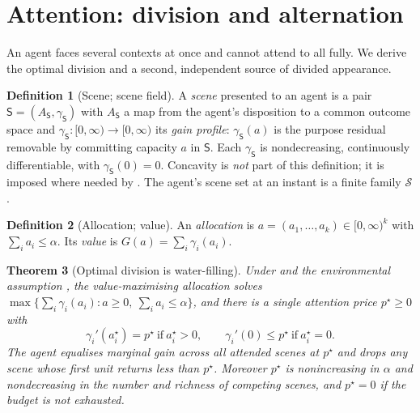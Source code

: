 \documentclass[11pt,a4paper]{article}
\theoremstyle{clstyle}
\newtheorem{theorem}{Theorem}[section]
\theoremstyle{definition}
\newtheorem{definition}[theorem]{Definition}
\theoremstyle{remark}
\newcommand{\price}{p^{\star}}
\newcommand{\att}{\alpha}
\newcommand{\Scene}{\mathsf{S}}
\newcommand{\scenes}{\mathcal{S}}
\begin{document}
\section{Attention: division and alternation}
\label{sec:attention}

An agent faces several contexts at once and cannot attend to all fully. We
derive the optimal division and a second, independent source of divided
appearance.

\begin{definition}[Scene; scene field]
\label{def:scene}
A \emph{scene} presented to an agent is a pair
$\Scene=(A_\Scene,\gamma_\Scene)$ with $A_\Scene$ a map from the agent's
disposition to a common outcome space and
$\gamma_\Scene:[0,\infty)\to[0,\infty)$ its \emph{gain profile}:
$\gamma_\Scene(a)$ is the purpose residual removable by committing capacity
$a$ in $\Scene$. Each $\gamma_\Scene$ is nondecreasing, continuously
differentiable, with $\gamma_\Scene(0)=0$. Concavity is \emph{not} part of
this definition; it is imposed where needed by . The agent's
scene set at an instant is a finite family $\scenes$.
\end{definition}

\begin{definition}[Allocation; value]
\label{def:alloc}
An \emph{allocation} is $a=(a_1,\dots,a_k)\in[0,\infty)^k$ with
$\sum_i a_i\le\att$. Its \emph{value} is $G(a)=\sum_i\gamma_i(a_i)$.
\end{definition}

\begin{theorem}[Optimal division is water-filling]
\label{thm:waterfill}
Under  and the environmental assumption ,
the value-maximising allocation solves
$\max\{\sum_i\gamma_i(a_i): a\ge0,\ \sum_i a_i\le\att\}$, and there is a
single \emph{attention price} $\price\ge0$ with
\[
\gamma_i'(a_i^{\star})=\price\ \text{if}\ a_i^{\star}>0,
\qquad
\gamma_i'(0)\le\price\ \text{if}\ a_i^{\star}=0.
\]
The agent equalises marginal gain across all attended scenes at $\price$ and
drops any scene whose first unit returns less than $\price$. Moreover
$\price$ is nonincreasing in $\att$ and nondecreasing in the number and
richness of competing scenes, and $\price=0$ if the budget is not exhausted.
\end{theorem}
\end{document}
